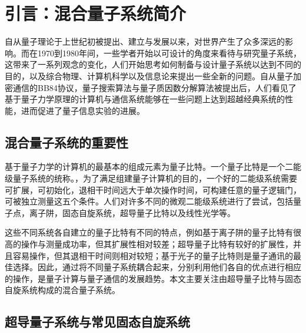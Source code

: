 \chapter{引言：混合量子系统简介}
\label{cha:intro}




        自从量子理论于上世纪初被提出、建立与发展以来，对世界产生了众多深远的影响。而在1970到1980年间，一些学者开始以可设计的角度来看待与研究量子系统\cite{feynman1982simulating}，这带来了一系列观念的变化，人们开始思考如何制备与设计量子系统以达到不同的目的，以及综合物理、计算机科学以及信息论来提出一些全新的问题。\cite{nielsen2002quantum}自从量子加密通信的BB84协议\cite{bennett1984quantum}，量子搜索算法\cite{grover1996fast}与量子质因数分解算法\cite{shor1994algorithms}被提出后，人们看见了基于量子力学原理的计算机与通信系统能够在一些问题上达到超越经典系统的性能，进而促进了量子信息实验的进展。

        \section{混合量子系统的重要性} %
        \label{sec:importance}

            基于量子力学的计算机的最基本的组成元素为量子比特。一个量子比特是一个二能级量子系统的统称。，为了满足组建量子计算机的目的，一个好的二能级系统需要可扩展，可初始化，退相干时间远大于单次操作时间，可构建任意的量子逻辑门，可被独立测量这五个条件\cite{divincenzo2000physical}。人们对许多不同的微观二能级系统进行了尝试，包括量子点\cite{loss1998quantum}，离子阱\cite{haffner2008quantum}，固态自旋系统\cite{gershenfeld1997bulk}，超导量子比特\cite{devoret2013superconducting}以及线性光学\cite{kok2007linear}等。

            这些不同系统各自建立的量子比特有不同的特点，例如基于离子阱的量子比特有很高的操作与测量成功率，但其扩展性相对较差；超导量子比特有较好的扩展性，并且容易操作，但其退相干时间则相对较短；基于光子的量子比特则是量子通讯的最佳选择。因此，通过将不同量子系统耦合起来，分别利用他们各自的优点进行相应的操作，是量子计算与量子通信的发展趋势。本文主要关注由超导量子比特与固态自旋系统构成的混合量子系统。








        \section{超导量子系统与常见固态自旋系统} %
        \label{sec:qubit_and_spin}

